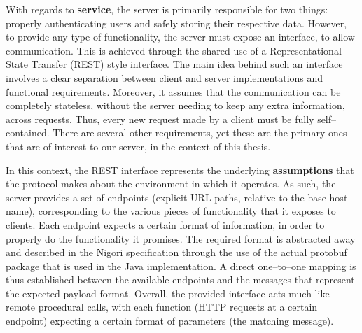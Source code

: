 With regards to \textbf{service}, the server is primarily responsible for two things: properly authenticating users and safely storing their respective data.
However, to provide any type of functionality, the server must expose an interface, to allow communication.
This is achieved through the shared use of a Representational State Transfer (REST) \cite{REST} style interface.
The main idea behind such an interface involves a clear separation between client and server implementations and functional requirements.
Moreover, it assumes that the communication can be completely stateless, without the server needing to keep any extra information, across requests.
Thus, every new request made by a client must be fully self--contained.
There are several other requirements, yet these are the primary ones that are of interest to our server, in the context of this thesis.

In this context, the REST interface represents the underlying \textbf{assumptions} that the protocol makes about the environment in which it operates.
As such, the server provides a set of endpoints (explicit URL paths, relative to the base host name), corresponding to the various pieces of functionality that it exposes to clients.
Each endpoint expects a certain format of information, in order to properly do the functionality it promises.
The required format is abstracted away and described in the Nigori specification through the use of the actual protobuf \cite{protobuf} package that is used in the Java implementation.
A direct one--to--one mapping is thus established between the available endpoints and the messages that represent the expected payload format.
Overall, the provided interface acts much like remote procedural calls, with each function (HTTP requests at a certain endpoint) expecting a certain format of parameters (the matching message).

